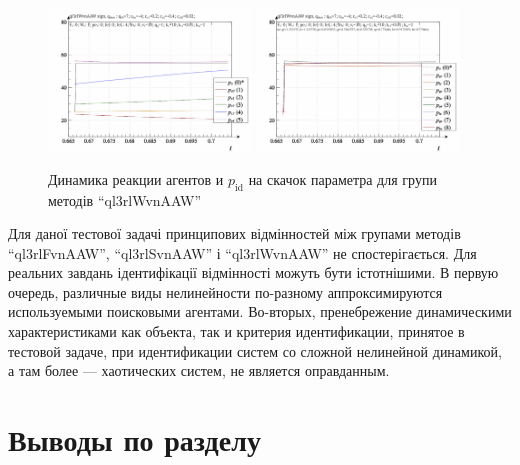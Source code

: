 \begin{figure}[htb!]
  \begin{center}
    \includegraphics[width=0.48\textwidth]{p/sign/qls-p_t_pi_m_ql3rlWvnAAW_sign.png}
    \hfill
    \includegraphics[width=0.48\textwidth]{p/sign/qls-p_t_p_m_ql3rlWvnAAW_sign.png}
  \end{center}
  \caption{Динамика реакции агентов и $p_\mathrm{id}$ на скачок параметра для групи методів ``ql3rlWvnAAW''}
  \label{atu:f:ql3rlWvnAAW_sign}
\end{figure}

Для даної тестової задачі принципових відмінностей між групами методів
``ql3rlFvnAAW'', ``ql3rlSvnAAW'' і ``ql3rlWvnAAW'' не спостерігається. Для
реальних завдань ідентифікації відмінності можуть бути істотнішими.
%
В первую очередь, различные виды нелинейности
по-разному аппроксимируются используемыми поисковыми агентами.
Во-вторых, пренебрежение динамическими характеристиками
как объекта, так и критерия идентификации, принятое
в тестовой задаче, при идентификации систем со сложной нелинейной динамикой,
а там более --- хаотических систем, не является оправданным.








\section{Выводы по разделу \thechapter} %

